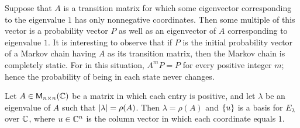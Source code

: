 \begin{note}
  Suppose that \(A\) is a transition matrix for which some eigenvector corresponding to the eigenvalue \(1\) has only nonnegative coordinates.
  Then some multiple of this vector is a probability vector \(P\) as well as an eigenvector of \(A\) corresponding to eigenvalue \(1\).
  It is interesting to observe that if \(P\) is the initial probability vector of a Markov chain having \(A\) as its transition matrix, then the Markov chain is completely static.
  For in this situation, \(A^m P = P\) for every positive integer \(m\);
  hence the probability of being in each state never changes.
\end{note}

\begin{thm}\label{5.18}
  Let \(A \in \ms[n][n][\C]\) be a matrix in which each entry is positive, and let \(\lambda\) be an eigenvalue of \(A\) such that \(\left\lvert\lambda\right\rvert = \rho(A)\).
  Then \(\lambda = \rho(A)\) and \(\left\lbrace u\right\rbrace\) is a basis for \(E_{\lambda}\) over \(\mathbb{C}\), where \(u \in \mathbb{C}^n\) is the column vector in which each coordinate equals \(1\).
\end{thm}

